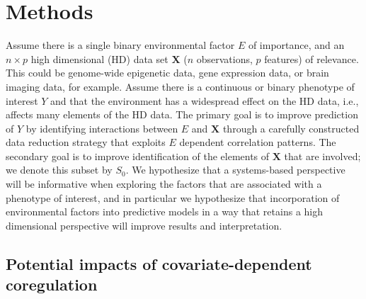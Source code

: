 \section{Methods}

Assume there is a single binary environmental factor $E$ of importance, and an $n \times p$ high dimensional (HD) data set $\textbf{X}$ ($n$ observations, $p$ features) of relevance.  This could be genome-wide epigenetic data, gene expression  data, or brain imaging data, for example. Assume there is a continuous or binary phenotype of interest $Y$ and that the environment has a widespread effect on the HD data, i.e., affects many elements of the HD data. The primary goal is to improve prediction of $Y$ by identifying interactions between $E$ and $\textbf{X}$ through a carefully constructed data reduction strategy that exploits $E$ dependent correlation patterns. The secondary goal is to improve identification of the elements of $\textbf{X}$ that are involved; we denote this subset by $S_0$. We hypothesize that a systems-based perspective will be informative when exploring the factors that are associated with a phenotype of interest, and in particular we hypothesize that incorporation of environmental factors into predictive models in a way that retains a high dimensional perspective will improve results and interpretation.

\subsection{Potential impacts of covariate-dependent coregulation}

